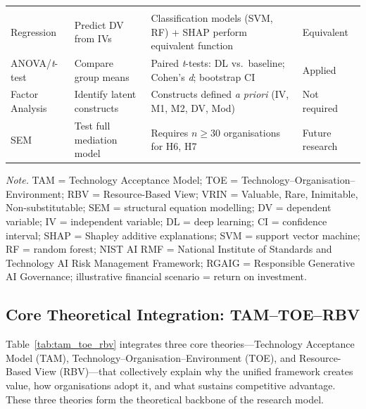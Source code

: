 {\begin{xltabular}{\textwidth}{@{} >{\raggedright\arraybackslash}p{2cm} L L L @{}}
\addlinespace
{} &  &  &  \\
\addlinespace
Regression & Predict DV from IVs & Classification models (SVM, RF) + SHAP perform equivalent function & Equivalent \\
ANOVA/\textit{t}-test & Compare group means & Paired \textit{t}-tests: DL vs.\ baseline; Cohen's \textit{d}; bootstrap CI & Applied \\
Factor Analysis & Identify latent constructs & Constructs defined \textit{a priori} (IV, M1, M2, DV, Mod) & Not required \\
SEM & Test full mediation model & Requires $n \geq 30$ organisations for H6, H7 & Future research \\
\end{xltabular}}
\vspace{0.5em}
\noindent\textit{Note.} TAM = Technology Acceptance Model; TOE = Technology--Organisation--Environment; RBV = Resource-Based View; VRIN = Valuable, Rare, Inimitable, Non-substitutable; SEM = structural equation modelling; DV = dependent variable; IV = independent variable; DL = deep learning; CI = confidence interval; SHAP = Shapley additive explanations; SVM = support vector machine; RF = random forest; NIST AI RMF = National Institute of Standards and Technology AI Risk Management Framework; RGAIG = Responsible Generative AI Governance; illustrative financial scenario = return on investment.
\fi %

\label{sec:theoretical_statistical}
\label{tab:theory_stats_summary}
\label{tab:tam_toe_rbv}
\label{tab:statistical_methods}

\iffalse %
\subsection{Core Theoretical Integration: TAM--TOE--RBV}

Table~\ref{tab:tam_toe_rbv} integrates three core theories---Technology Acceptance Model (TAM), Technology--Organisation--Environment (TOE), and Resource-Based View (RBV)---that collectively explain why the unified framework creates value, how organisations adopt it, and what sustains competitive advantage. These three theories form the theoretical backbone of the research model.


